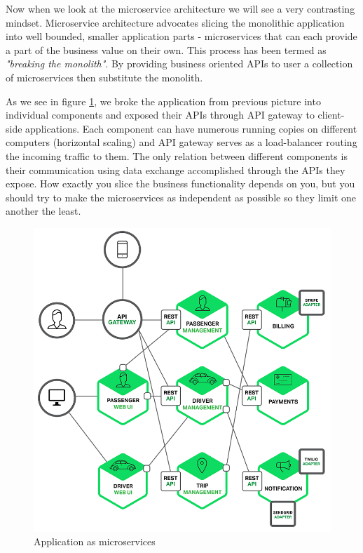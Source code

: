 \documentclass[12pt,oneside]{fithesis2}
\begin{document}
Now when we look at the microservice architecture we will see a very contrasting mindset. Microservice architecture advocates slicing the monolithic application into well bounded, smaller application parts - microservices that can each provide a part of the business value on their own. This process has been termed as \textit{"breaking the monolith"}. By providing business oriented APIs to user a collection of microservices then substitute the monolith.

As we see in figure \ref{microservice_application}, we broke the application from previous picture into individual components and exposed their APIs through API gateway to client-side applications. Each component can have numerous running copies on different computers (horizontal scaling) and API gateway serves as a load-balancer routing the incoming traffic to them. The only relation between different components is their communication using data exchange accomplished through the APIs they expose. How exactly you slice the business functionality depends on you, but you should try to make the microservices as independent as possible so they limit one another the least.

\begin{figure}[ht!]
	\label{microservice_application}
	\centering
	\includegraphics[width=\textwidth]{images/microservice_application2.png}
	\caption{Application as microservices\footnotemark}
\end{figure}
\end{document}
